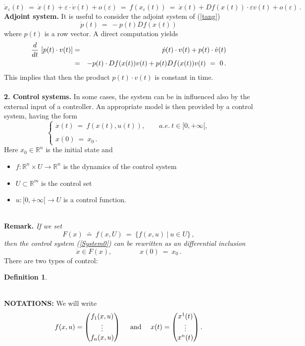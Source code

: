 \documentclass[letterpaper,12pt]{article}
\numberwithin{equation}{section}
\def\ve{\varepsilon}
\def\bel{\begin{equation}\label}
\def\eeq{\end{equation}}
\newtheorem{definition}[theorem]{Definition}
\begin{document}
\[
\dot{x}_{\ve}(t)~=~\dot{x}(t)+\ve\cdot \dot{v}(t)+o(\ve)~=~f(x_{\ve}(t))~=~\dot{x}(t)+Df(x(t))\cdot \ve v(t)+o(\ve)\,.
\]
{\bf Adjoint system.} It is useful to consider the adjoint system of (\ref{tang})
\bel{adj}
\dot{p}(t)~=~-p(t) Df(x(t))
\eeq
where $p(t)$ is a row vector. A direct computation yields 
\begin{eqnarray*}
{d\over dt}~[p(t)\cdot v(t)]&=&\dot{p}(t)\cdot v(t)+p(t)\cdot \dot{v}(t)\\
&=&-p(t)\cdot Df(x(t)) v(t)+p(t) Df(x(t)) v(t)~=~0\,.
\end{eqnarray*}
This implies that then the product $p(t)\cdot v(t)$ is constant in time.
\quad\\
\quad\\
{\bf 2. Control systems.} In some cases, the system can be in influenced also by the external input of a controller. An appropriate model is
then provided by a control system, having the form
\begin{equation}\label{System0}
 \left\{\begin{array}{ll}
\dot{x}(t)\: = \: f(x(t),u(t)),\qquad a.e.~t\in[0,+\infty[, \\
\\
x(0)  \: = \:  x_0\,.
\end{array}\right.
\end{equation}
Here $x_0\in\mathbb{R}^n$ is the initial state and 
\begin{itemize}
\item  $f:\mathbb{R}^n\times U\rightarrow\mathbb{R}^n$ is the dynamics of the control system
\item $U\subset\mathbb{R}^m$ is the control set
\item $u:[0,+\infty[\rightarrow U$ is a control function. 
\end{itemize}
\quad\\
{\bf Remark.} {\it If we set 
\[
F(x)~\doteq~f(x,U)~=~\{f(x,u)~|~u\in U\}\,,
\]
then the control system (\ref{System0}) can be rewritten as an differential inclusion
\[
\dot{x}\in F(x),\qquad\qquad x(0)~=~x_0\,.
\]}
\noindent There are two types of control:
\begin{definition}
\end{definition}
\quad\\
\noindent\textbf{NOTATIONS:} We will write\\
\begin{equation*}
f(x,u)=
\begin{pmatrix}
f_1(x,u)\\
\vdots\\
f_n(x,u)
\end{pmatrix}
\ \quad\mathrm{and}\ \quad
x(t)=
\begin{pmatrix}
x^1(t)\\
\vdots\\
x^n(t)
\end{pmatrix}.
\\
\end{equation*}
\end{document}
